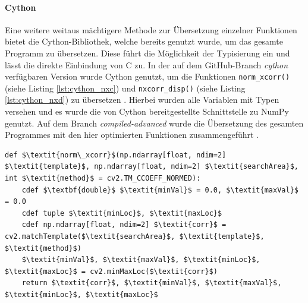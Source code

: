 \paragraph{Cython}

Eine weitere weitaus mächtigere Methode zur Übersetzung einzelner Funktionen bietet die Cython-Bibliothek, welche bereits genutzt wurde, um das gesamte Programm zu übersetzen. Diese führt die Möglichkeit der Typisierung ein und lässt die direkte Einbindung von C zu. In der auf dem GitHub-Branch \textit{cython} verfügbaren Version wurde Cython genutzt, um die Funktionen \texttt{norm\_xcorr()} (siehe Listing \ref{lst:cython_nxc}) und \texttt{nxcorr\_disp()} (siehe Listing \ref{lst:cython_nxd}) zu übersetzen \cite{CBS18}. Hierbei wurden alle Variablen mit Typen versehen und es wurde die von Cython bereitgestellte Schnittstelle zu NumPy genutzt. Auf dem Branch \textit{compiled-advanced} wurde die Übersetzung des gesamten Programmes mit den hier optimierten Funktionen zusammengeführt \cite{CBS18}. 

\begin{lstlisting}[caption={Die in Cython optimierte Funktion norm\_xcorr()}, label={lst:cython_nxc}]
def $\textit{norm\_xcorr}$(np.ndarray[float, ndim=2] $\textit{template}$, np.ndarray[float, ndim=2] $\textit{searchArea}$, int $\textit{method}$ = cv2.TM_CCOEFF_NORMED):
	cdef $\textbf{double}$ $\textit{minVal}$ = 0.0, $\textit{maxVal}$ = 0.0
	cdef tuple $\textit{minLoc}$, $\textit{maxLoc}$
	cdef np.ndarray[float, ndim=2] $\textit{corr}$ = cv2.matchTemplate($\textit{searchArea}$, $\textit{template}$, $\textit{method}$)
	$\textit{minVal}$, $\textit{maxVal}$, $\textit{minLoc}$, $\textit{maxLoc}$ = cv2.minMaxLoc($\textit{corr}$)
	return $\textit{corr}$, $\textit{minVal}$, $\textit{maxVal}$, $\textit{minLoc}$, $\textit{maxLoc}$
\end{lstlisting}

